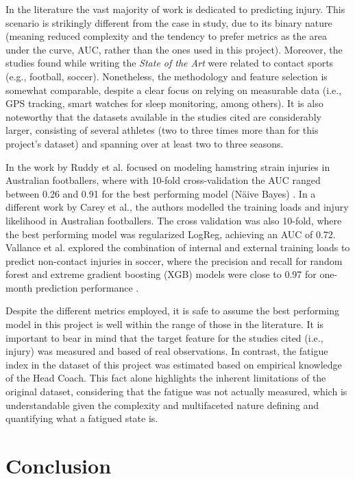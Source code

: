 \documentclass[conference]{IEEEtran}
\begin{document}
In the literature the vast majority of work is dedicated to predicting injury. This scenario is strikingly different from the case in study, due to its binary nature (meaning reduced complexity and the tendency to prefer metrics as the area under the curve, AUC, rather than the ones used in this project). Moreover, the studies found while writing the \textit{State of the Art} were related to contact sports (e.g., football, soccer). Nonetheless, the methodology and feature selection is somewhat comparable, despite a clear focus on relying on measurable data (i.e., GPS tracking, smart watches for sleep monitoring, among others). It is also noteworthy that the datasets available in the studies cited are considerably larger, consisting of several athletes (two to three times more than for this project's dataset) and spanning over at least two to three seasons. 

In the work by Ruddy et al. focused on modeling hamstring strain injuries in Australian footballers, where with 10-fold cross-validation the AUC ranged between 0.26 and 0.91 for the best performing model (Näive Bayes) \cite{ruddy2018predictive}. In a different work by Carey et al., the authors modelled the training loads and injury likelihood in Australian footballers. The cross validation was also 10-fold, where the best performing model was regularized LogReg, achieving an AUC of 0.72. Vallance et al. explored the combination of internal and external training loads to predict non-contact injuries in soccer, where the precision and recall for random forest and extreme gradient boosting (XGB) models were close to 0.97 for one-month prediction performance \cite{Carey_2018}.

Despite the different metrics employed, it is safe to assume the best performing model in this project is well within the range of those in the literature. It is important to bear in mind that the target feature for the studies cited (i.e., injury) was measured and based of real observations. In contrast, the fatigue index in the dataset of this project was estimated based on empirical knowledge of the Head Coach. This fact alone highlights the inherent limitations of the original dataset, considering that the fatigue was not actually measured, which is understandable given the complexity and multifaceted nature defining and quantifying what a fatigued state is.

\section{Conclusion}
\end{document}

